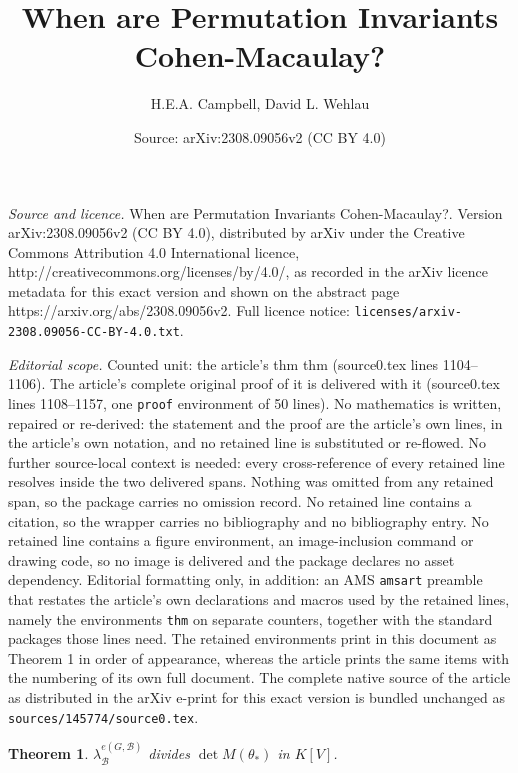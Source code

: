 \documentclass[10pt,a4paper]{amsart}
\title{When are Permutation Invariants Cohen-Macaulay?}
\author{H.E.A. Campbell, David L. Wehlau}
\date{Source: arXiv:2308.09056v2 (CC BY 4.0)}
\newtheorem{thm}{Theorem}
\newcommand{\KK}{K}
\newcommand{\bth}{{{\theta_*}}} %
\newcommand{\calb}{\mathcal{B}}
\begin{document}
\maketitle

\noindent\emph{Source and licence.} When are Permutation Invariants Cohen-Macaulay?. Version arXiv:2308.09056v2 (CC BY 4.0), distributed by arXiv under the Creative Commons Attribution 4.0 International licence, http://creativecommons.org/licenses/by/4.0/, as recorded in the arXiv licence metadata for this exact version and shown on the abstract page https://arxiv.org/abs/2308.09056v2. Full licence notice: \texttt{licenses/arxiv-2308.09056-CC-BY-4.0.txt}.\par\smallskip

\noindent\textit{Editorial scope.} Counted unit: the article's thm thm (source0.tex lines 1104--1106). The article's complete original proof of it is delivered with it (source0.tex lines 1108--1157, one \texttt{proof} environment of 50 lines). No mathematics is written, repaired or re-derived: the statement and the proof are the article's own lines, in the article's own notation, and no retained line is substituted or re-flowed.  No further source-local context is needed: every cross-reference of every retained line resolves inside the two delivered spans.  Nothing was omitted from any retained span, so the package carries no omission record.  No retained line contains a citation, so the wrapper carries no bibliography and no bibliography entry.  No retained line contains a figure environment, an image-inclusion command or drawing code, so no image is delivered and the package declares no asset dependency.  Editorial formatting only, in addition: an AMS \texttt{amsart} preamble that restates the article's own declarations and macros used by the retained lines, namely the environments \texttt{thm} on separate counters, together with the standard packages those lines need.  The retained environments print in this document as Theorem 1 in order of appearance, whereas the article prints the same items with the numbering of its own full document.  The complete native source of the article as distributed in the arXiv e-print for this exact version is bundled unchanged as \texttt{sources/145774/source0.tex}.
\begin{thm}
$\lambda_\calb^{e(G,\calb)}$ divides $\det M(\bth)$ in $\KK[V]$.  
\end{thm}
\end{document}
